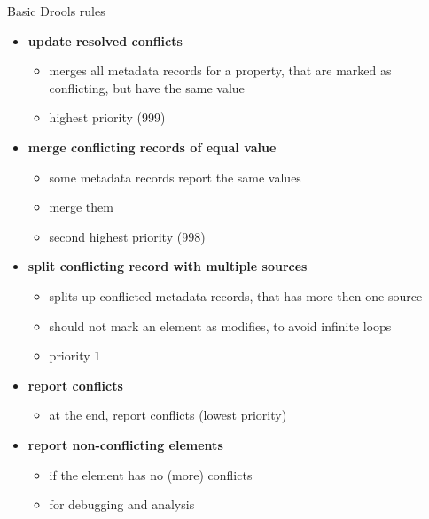 \documentclass{beamer}
\begin{document}
\begin{frame}{Basic Drools rules}

   \begin{itemize}
   \item \textbf{update resolved conflicts}
   \begin{itemize}
	   \item merges all metadata records for a property, that are marked as conflicting, but have the same value
	   \item highest priority (999)
   \end{itemize}
   \item \textbf{merge conflicting records of equal value}
   \begin{itemize}
   		\item some metadata records report the same values
   		\item merge them
   		\item second highest priority (998)
   \end{itemize}
   \item \textbf{split conflicting record with multiple sources} 
   \begin{itemize}
   		\item splits up conflicted metadata records, that has more then one source
   		\item should not mark an element as modifies, to avoid infinite loops
   		\item priority 1
   \end{itemize}
   \item \textbf{report conflicts} 
      \begin{itemize}
      		\item at the end, report conflicts (lowest priority)
      \end{itemize}
   \item \textbf{report non-conflicting elements} 
      \begin{itemize}
      		\item if the element has no (more) conflicts
      		\item for debugging and analysis
      \end{itemize}
   \end{itemize}
  
\note{

}
\end{frame}
\end{document}
